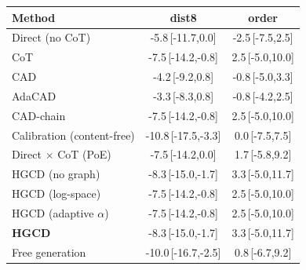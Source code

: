 \begin{tabular}{lcc}
\toprule
Method & dist8 & order \\
\midrule
Direct (no CoT) & -5.8\,{\scriptsize[-11.7,0.0]} & -2.5\,{\scriptsize[-7.5,2.5]} \\
CoT & -7.5\,{\scriptsize[-14.2,-0.8]} & 2.5\,{\scriptsize[-5.0,10.0]} \\
CAD & -4.2\,{\scriptsize[-9.2,0.8]} & -0.8\,{\scriptsize[-5.0,3.3]} \\
AdaCAD & -3.3\,{\scriptsize[-8.3,0.8]} & -0.8\,{\scriptsize[-4.2,2.5]} \\
CAD-chain & -7.5\,{\scriptsize[-14.2,-0.8]} & 2.5\,{\scriptsize[-5.0,10.0]} \\
Calibration (content-free) & -10.8\,{\scriptsize[-17.5,-3.3]} & 0.0\,{\scriptsize[-7.5,7.5]} \\
Direct $\times$ CoT (PoE) & -7.5\,{\scriptsize[-14.2,0.0]} & 1.7\,{\scriptsize[-5.8,9.2]} \\
HGCD (no graph) & -8.3\,{\scriptsize[-15.0,-1.7]} & 3.3\,{\scriptsize[-5.0,11.7]} \\
HGCD (log-space) & -7.5\,{\scriptsize[-14.2,-0.8]} & 2.5\,{\scriptsize[-5.0,10.0]} \\
HGCD (adaptive $\alpha$) & -7.5\,{\scriptsize[-14.2,-0.8]} & 2.5\,{\scriptsize[-5.0,10.0]} \\
\textbf{HGCD} & -8.3\,{\scriptsize[-15.0,-1.7]} & 3.3\,{\scriptsize[-5.0,11.7]} \\
Free generation & -10.0\,{\scriptsize[-16.7,-2.5]} & 0.8\,{\scriptsize[-6.7,9.2]} \\
\bottomrule
\end{tabular}
